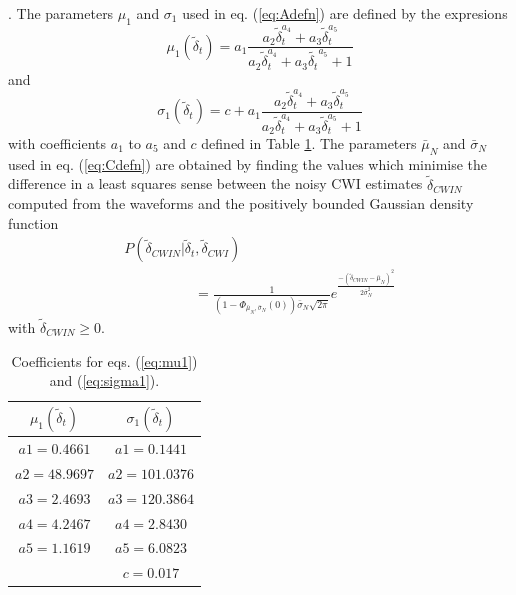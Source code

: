 \documentclass[extra]{gji}
\begin{document}
\citep{dr_Robinson10b}. The parameters $\mu_1$ and $\sigma_1$ used in
eq. (\ref{eq:Adefn}) are defined by the expresions
\begin{equation}
\label{eq:mu1}
\mu_1(\widetilde{\delta}_t) = a_1\frac{a_2 \widetilde{\delta}_t^{a_4}+a_3
\widetilde{\delta}_t^{a_5}}{a_2 \widetilde{\delta}_t^{a_4}+a_3 \widetilde{\delta_t}^{a_5}+1}
\end{equation}
and
\begin{equation}
\label{eq:sigma1}
\sigma_1(\widetilde{\delta}_t) = c + a_1\frac{a_2 \widetilde{\delta}_t^{a_4}+
a_3 \widetilde{\delta}_t^{a_5}}{a_2 \widetilde{\delta}_t^{a_4}+a_3 \widetilde{\delta}_t^{a_5}+1}
\end{equation}
with coefficients $a_1$ to $a_5$ and $c$ defined in Table \ref{tab-const4-mu1-sigma1}.
The parameters $\bar{\mu}_N$ and $\bar{\sigma}_N$ used in
eq. (\ref{eq:Cdefn}) are obtained by finding the values which minimise the
difference in a least squares sense between the noisy CWI estimates $\widetilde{\delta}_{CWIN}$
computed from the waveforms and the
positively bounded Gaussian density function
\begin{equation}
\label{eq-likelihood-noisydata-pdf-orig}
\begin{array}{l}
P(\widetilde{\delta}_{CWIN}|\widetilde{\delta}_t,\widetilde{\delta}_{CWI}) \\
\hspace{5em} = \frac{1}{\left(1-\Phi_{\bar{\mu}_N,\bar{\sigma}_N}(0)\right)\bar{\sigma}_N\sqrt{2\pi}}
e^{  \frac{-(\widetilde{\delta}_{CWIN}-\bar{\mu}_N)^2}{2\bar{\sigma}_N^2}  }
\end{array}
\end{equation}
with $\widetilde{\delta}_{CWIN} \geq 0$.


\begin{table}
\caption{Coefficients for eqs. (\ref{eq:mu1}) and (\ref{eq:sigma1}).}
\label{tab-const4-mu1-sigma1}
\begin{tabular}{|c|c|}
\hline
$\mu_1(\widetilde{\delta}_t)$ & $\sigma_1(\widetilde{\delta}_t)$ \\
\hline
$a1 = 0.4661$ & $a1 = 0.1441$\\
$a2 = 48.9697$ & $a2 = 101.0376$\\
$a3 = 2.4693$ & $a3 = 120.3864$\\
$a4 = 4.2467$ & $a4 = 2.8430$\\
$a5 = 1.1619$ & $a5 = 6.0823$ \\
     & $c = 0.017$ \\
\hline
\end{tabular}
\end{table}
\end{document}
